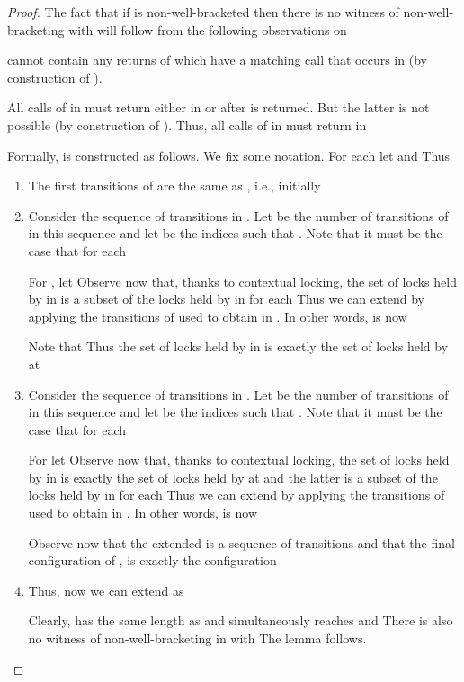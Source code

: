 \documentclass{LMCS}
\begin{document}
\begin{proof}
The fact that if  is non-well-bracketed then there is no
witness  of non-well-bracketing with
 will follow from the following observations on


\begin{iteMize}{}
\item[]  cannot contain any returns of  which
  have a matching call that occurs in  (by construction of
  ).
\item[] All calls of  in  must return
  either in  or after  is returned. But the latter is not
  possible (by construction of ). Thus, all calls of 
  in  must return in 
\end{iteMize}


Formally,  is constructed as follows. We fix some
notation.  For each  let  and
 Thus 
\begin{enumerate}[(1)]

\item The first  transitions of  are the
  same as , i.e., initially
  
  
\item Consider the sequence of transitions
   in . Let  be the number of transitions of 
  in this sequence and let  be the indices such that
  . Note that it must be the case that for each 
 

 For ,  let 
 Observe now that, thanks to contextual locking, the set of locks held by  in  is a subset of the locks held
 by  in  for each  Thus we can extend 
 by applying the   transitions of   used to obtain  in .
 In other words,  is now
 

     Note that 
     Thus the set of locks held by  in   is exactly the set of locks held by  at
        


     \item
     Consider the sequence of transitions  in . Let  be the number of transitions of
  in  this sequence and let
  be the indices such that
  . Note that it must be the case that for each 
 

 For   let  
 Observe now that, thanks to contextual locking, the set of locks held by  in  is
  exactly the set of locks held by  at
         and the latter is  a subset of the locks held
 by  in  for each 
 Thus we can extend 
 by applying the   transitions of   used to obtain  in .
 In other words,  is now
 



       Observe now that the extended  is a sequence of  transitions  and that the final configuration
       of , 
       is exactly the configuration 
      \item Thus, now we can extend  as
      
        Clearly,  has the same length as  and simultaneously reaches  and     There is also no  witness  of non-well-bracketing in  with
  The lemma follows. \qedhere  \end{enumerate} 
\end{proof}
\end{document}
